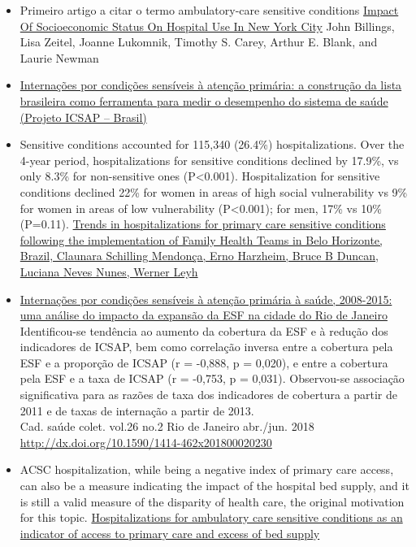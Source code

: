 \documentclass[]{book}
\begin{document}
\begin{itemize}
\item
  Primeiro artigo a citar o termo ambulatory-care sensitive conditions \href{https://www.healthaffairs.org/doi/pdf/10.1377/hlthaff.12.1.162}{Impact Of Socioeconomic Status On Hospital Use In New York City} John Billings, Lisa Zeitel, Joanne Lukomnik, Timothy S. Carey, Arthur E. Blank, and Laurie Newman
\item
  \href{http://www.scielo.br/pdf/csp/v25n6/16.pdf}{Internações por condições sensíveis à atenção primária: a construção da lista brasileira como ferramenta para medir o desempenho do sistema de saúde (Projeto ICSAP -- Brasil)}
\item
  Sensitive conditions accounted for 115,340 (26.4\%) hospitalizations. Over the 4-year period, hospitalizations for sensitive conditions declined by 17.9\%, vs only 8.3\% for non-sensitive ones (P\textless{}0.001). Hospitalization for sensitive conditions declined 22\% for women in areas of high social vulnerability vs 9\% for women in areas of low vulnerability (P\textless{}0.001); for men, 17\% vs 10\% (P=0.11). \href{https://academic.oup.com/heapol/article/27/4/348/605470}{Trends in hospitalizations for primary care sensitive conditions following the implementation of Family Health Teams in Belo Horizonte, Brazil, Claunara Schilling Mendonça, Erno Harzheim, Bruce B Duncan, Luciana Neves Nunes, Werner Leyh}
\item
  \href{http://www.scielo.br/scielo.php?script=sci_arttext\&pid=S1414-462X2018000200178\&lng=pt\&nrm=iso\&tlng=pt}{Internações por condições sensíveis à atenção primária à saúde, 2008-2015: uma análise do impacto da expansão da ESF na cidade do Rio de Janeiro}\\
  Identificou-se tendência ao aumento da cobertura da ESF e à redução dos indicadores de ICSAP, bem como correlação inversa entre a cobertura pela ESF e a proporção de ICSAP (r = -0,888, p = 0,020), e entre a cobertura pela ESF e a taxa de ICSAP (r = -0,753, p = 0,031). Observou-se associação significativa para as razões de taxa dos indicadores de cobertura a partir de 2011 e de taxas de internação a partir de 2013.\\
  Cad. saúde colet. vol.26 no.2 Rio de Janeiro abr./jun. 2018 \url{http://dx.doi.org/10.1590/1414-462x201800020230}
\item
  ACSC hospitalization, while being a negative index of primary care access, can also be a measure indicating the impact of the hospital bed supply, and it is still a valid measure of the disparity of health care, the original motivation for this topic. \href{https://bmchealthservres.biomedcentral.com/articles/10.1186/s12913-019-4098-x}{Hospitalizations for ambulatory care sensitive conditions as an indicator of access to primary care and excess of bed supply}
\end{itemize}
\end{document}
